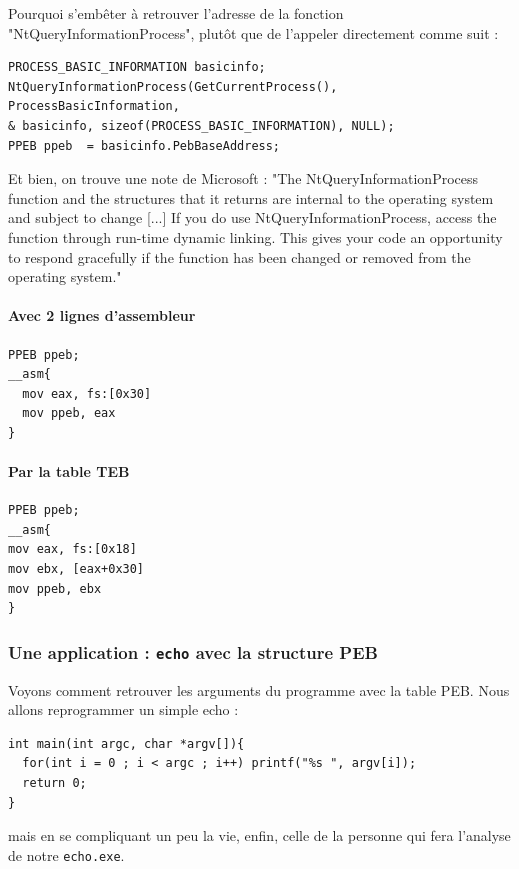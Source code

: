 \documentclass{book}
\newcommand{\code}[1]{\texttt{#1}}
\begin{document}
Pourquoi s'embêter à retrouver l'adresse de la fonction "NtQueryInformationProcess", plutôt que de l'appeler directement comme suit : 

\begin{verbatim}
PROCESS_BASIC_INFORMATION basicinfo;
NtQueryInformationProcess(GetCurrentProcess(), ProcessBasicInformation, 
& basicinfo, sizeof(PROCESS_BASIC_INFORMATION), NULL);
PPEB ppeb  = basicinfo.PebBaseAddress;
\end{verbatim}

Et bien, on trouve une note de Microsoft :  "The NtQueryInformationProcess function and the structures that it returns are internal to the operating system and subject to change [...] If you do use NtQueryInformationProcess, access the function through run-time dynamic linking. This gives your code an opportunity to respond gracefully if the function has been changed or removed from the operating system." 


\paragraph{Avec 2 lignes d'assembleur}

\begin{verbatim}
PPEB ppeb;
__asm{
  mov eax, fs:[0x30]
  mov ppeb, eax
}
\end{verbatim}

\paragraph{Par la table TEB}

\begin{verbatim}
PPEB ppeb;
__asm{
mov eax, fs:[0x18]
mov ebx, [eax+0x30]
mov ppeb, ebx
}
\end{verbatim}



\subsubsection{Une application : {\tt echo} avec la structure PEB}

Voyons comment retrouver les arguments du programme avec la table PEB. Nous allons reprogrammer un simple echo : 

\begin{verbatim}
int main(int argc, char *argv[]){
  for(int i = 0 ; i < argc ; i++) printf("%s ", argv[i]);
  return 0;
}
\end{verbatim}
mais en se compliquant un peu la vie, enfin, celle de la personne qui fera l'analyse de notre \code{echo.exe}.  
\end{document}
